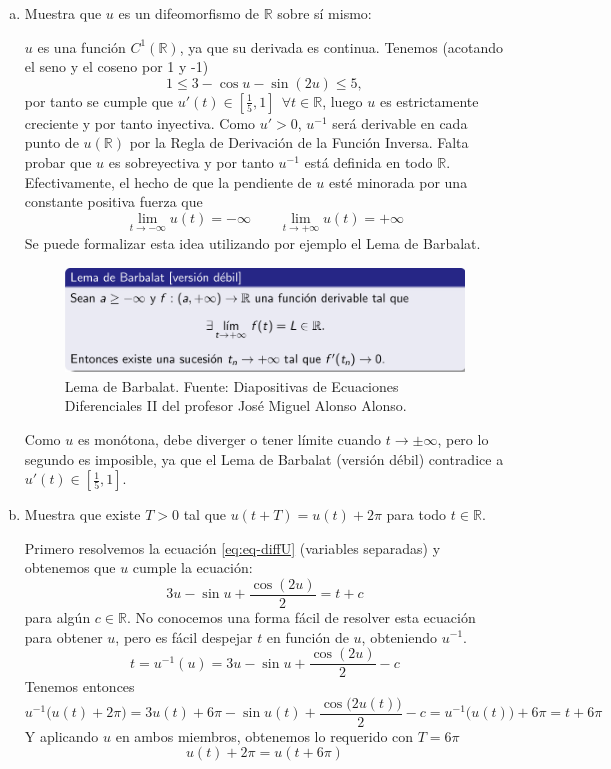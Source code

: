 \documentclass[12pt,spanish]{article}
\theoremstyle{definition}
\theoremstyle{remark}
\begin{document}
  \begin{enumerate}[a)]
  \item Muestra que $u$ es un difeomorfismo de $\mathbb{R}$ sobre sí
    mismo:

    $u$ es una función $C^1(\mathbb{R})$, ya que su derivada es
    continua. Tenemos (acotando el seno y el coseno por 1 y -1)
    \[1\leq 3-\cos u - \sin(2u)\leq 5,\] por tanto se cumple que
    $u'(t)\in [\frac{1}{5},1]\ \ \forall t\in\mathbb{R}$, luego $u$ es
    estrictamente creciente y por tanto inyectiva. Como $u'>0$,
    $u^{-1}$ será derivable en cada punto de $u(\mathbb{R})$ por la
    Regla de Derivación de la Función Inversa. Falta probar que $u$ es
    sobreyectiva y por tanto $u^{-1}$ está definida en todo
    $\mathbb{R}$. Efectivamente, el hecho de que la pendiente de $u$
    esté minorada por una constante positiva fuerza que
    \[\lim_{t\to-\infty}u(t)=-\infty\qquad \lim_{t\to+\infty}u(t)=+\infty\]
    Se puede formalizar esta idea utilizando por ejemplo el Lema de Barbalat.
    \begin{figure}[H]
      \centering
      \includegraphics[width=140mm]{barbalat}
      \caption{Lema de Barbalat. Fuente: Diapositivas de Ecuaciones Diferenciales II del profesor José Miguel Alonso Alonso.}
      \label{fig:barbalat}
    \end{figure}
    Como $u$ es monótona, debe diverger o tener límite cuando
    $t\to \pm\infty$, pero lo segundo es imposible, ya que el Lema de
    Barbalat (versión débil) contradice a $u'(t)\in [\frac{1}{5},1]$.
    
  \item Muestra que existe $T>0$ tal que $u(t+T)=u(t)+2\pi$ para todo
    $t\in\mathbb{R}$.

    Primero resolvemos la ecuación \ref{eq:eq-diffU} (variables separadas) y obtenemos
    que $u$ cumple la ecuación:
    \begin{equation} \label{eq:eqU} 3u-\sin u + \frac{\cos(2u)}{2}=t+c
    \end{equation}
    para algún $c\in\mathbb{R}$. No conocemos una forma fácil de
    resolver esta ecuación para obtener $u$, pero es fácil despejar
    $t$ en función de $u$, obteniendo $u^{-1}$.
    \begin{equation} \label{eq:u-1} t=u^{-1}(u)=3u-\sin u +
      \frac{\cos(2u)}{2}-c
    \end{equation}
    Tenemos entonces
    \[u^{-1}\big(u(t)+2\pi\big)=3u(t)+6\pi -\sin u(t)
      +\frac{\cos\big(2u(t)\big)}{2}-c=u^{-1}\big(u(t)\big)+6\pi=t+6\pi\]
    Y aplicando $u$ en ambos miembros, obtenemos lo requerido con
    $T=6\pi$
    \[u(t)+2\pi=u(t+6\pi)\]
    

\end{enumerate}
\end{document}
